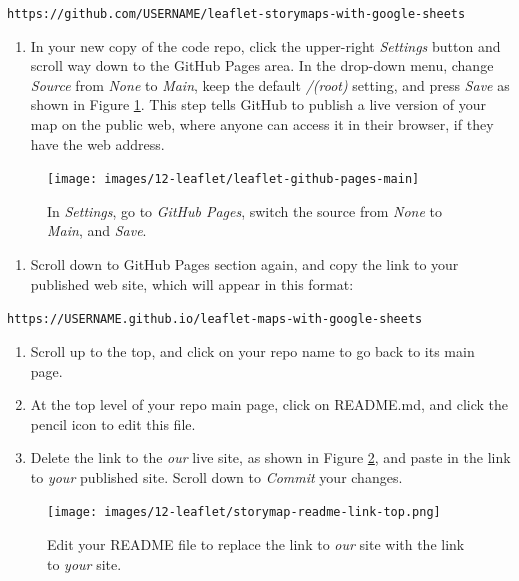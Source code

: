 \documentclass[
  english,
]{book}
\providecommand{\tightlist}{%
  \setlength{\itemsep}{0pt}\setlength{\parskip}{0pt}}
\begin{document}
\texttt{https://github.com/USERNAME/leaflet-storymaps-with-google-sheets}

\begin{enumerate}
\def\labelenumi{\arabic{enumi}.}
\setcounter{enumi}{3}
\tightlist
\item
  In your new copy of the code repo, click the upper-right \emph{Settings} button and scroll way down to the GitHub Pages area. In the drop-down menu, change \emph{Source} from \emph{None} to \emph{Main}, keep the default \emph{/(root)} setting, and press \emph{Save} as shown in Figure \ref{fig:leaflet-github-pages-main3}. This step tells GitHub to publish a live version of your map on the public web, where anyone can access it in their browser, if they have the web address.
\end{enumerate}



\begin{figure}
\texttt{[image: images/12-leaflet/leaflet-github-pages-main]} \caption{In \emph{Settings}, go to \emph{GitHub Pages}, switch the source from \emph{None} to \emph{Main}, and \emph{Save}.}\label{fig:leaflet-github-pages-main3}
\end{figure}

\begin{enumerate}
\def\labelenumi{\arabic{enumi}.}
\setcounter{enumi}{4}
\tightlist
\item
  Scroll down to GitHub Pages section again, and copy the link to your published web site, which will appear in this format:
\end{enumerate}

\texttt{https://USERNAME.github.io/leaflet-maps-with-google-sheets}

\begin{enumerate}
\def\labelenumi{\arabic{enumi}.}
\setcounter{enumi}{5}
\item
  Scroll up to the top, and click on your repo name to go back to its main page.
\item
  At the top level of your repo main page, click on README.md, and click the pencil icon to edit this file.
\item
  Delete the link to the \emph{our} live site, as shown in Figure \ref{fig:storymap-readme-link-top}, and paste in the link to \emph{your} published site. Scroll down to \emph{Commit} your changes.
\end{enumerate}



\begin{figure}
\centering
\texttt{[image: images/12-leaflet/storymap-readme-link-top.png]}
\caption{\label{fig:storymap-readme-link-top}Edit your README file to replace the link to \emph{our} site with the link to \emph{your} site.}
\end{figure}
\end{document}
